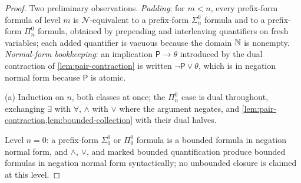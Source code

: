 \begin{proof}
Two preliminary observations.  \emph{Padding}: for \(m<n\), every
prefix-form formula of level \(m\) is \(\mathcal N\)-equivalent to a
prefix-form \(\Sigma^0_n\) formula and to a prefix-form \(\Pi^0_n\)
formula, obtained by prepending and interleaving quantifiers on fresh
variables; each added quantifier is vacuous because the domain \(\mathbb{N}\) is
nonempty.  \emph{Normal-form bookkeeping}: an implication
\(\mathsf P\to\theta\) introduced by the dual contraction of
\cref{lem:pair-contraction} is written \(\neg\mathsf P\lor\theta\), which
is in negation normal form because \(\mathsf P\) is atomic.

(a) Induction on \(n\), both classes at once; the \(\Pi^0_n\) case is dual
throughout, exchanging \(\exists\) with \(\forall\), \(\land\) with
\(\lor\) where the argument negates, and
\cref{lem:pair-contraction,lem:bounded-collection} with their dual halves.

Level \(n=0\): a prefix-form \(\Sigma^0_0\) or \(\Pi^0_0\) formula is a
bounded formula in negation normal form, and \(\land\), \(\lor\), and
marked bounded quantification produce bounded formulas in negation normal
form syntactically; no unbounded closure is claimed at this level.


\end{proof}
